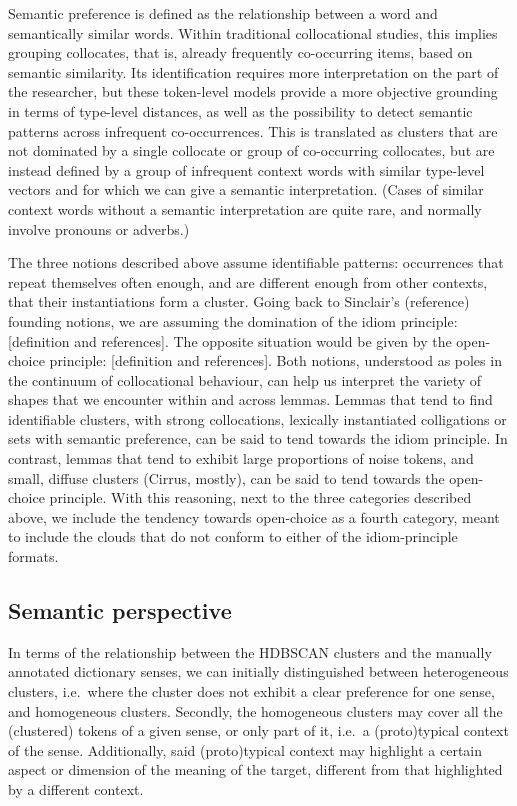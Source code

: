 \documentclass[
]{book}
\begin{document}
Semantic preference is defined as the relationship between a word and semantically similar words. Within traditional collocational studies, this implies grouping collocates, that is, already frequently co-occurring items, based on semantic similarity. Its identification requires more interpretation on the part of the researcher, but these token-level models provide a more objective grounding in terms of type-level distances, as well as the possibility to detect semantic patterns across infrequent co-occurrences. This is translated as clusters that are not dominated by a single collocate or group of co-occurring collocates, but are instead defined by a group of infrequent context words with similar type-level vectors and for which we can give a semantic interpretation. (Cases of similar context words without a semantic interpretation are quite rare, and normally involve pronouns or adverbs.)

The three notions described above assume identifiable patterns: occurrences that repeat themselves often enough, and are different enough from other contexts, that their instantiations form a cluster. Going back to Sinclair's (reference) founding notions, we are assuming the domination of the idiom principle: {[}definition and references{]}. The opposite situation would be given by the open-choice principle: {[}definition and references{]}. Both notions, understood as poles in the continuum of collocational behaviour, can help us interpret the variety of shapes that we encounter within and across lemmas. Lemmas that tend to find identifiable clusters, with strong collocations, lexically instantiated colligations or sets with semantic preference, can be said to tend towards the idiom principle. In contrast, lemmas that tend to exhibit large proportions of noise tokens, and small, diffuse clusters (Cirrus, mostly), can be said to tend towards the open-choice principle. With this reasoning, next to the three categories described above, we include the tendency towards open-choice as a fourth category, meant to include the clouds that do not conform to either of the idiom-principle formats.

\hypertarget{semantically}{%
\subsection{Semantic perspective}\label{semantically}}

In terms of the relationship between the HDBSCAN clusters and the manually annotated dictionary senses, we can initially distinguished between heterogeneous clusters, i.e.~where the cluster does not exhibit a clear preference for one sense, and homogeneous clusters. Secondly, the homogeneous clusters may cover all the (clustered) tokens of a given sense, or only part of it, i.e.~a (proto)typical context of the sense. Additionally, said (proto)typical context may highlight a certain aspect or dimension of the meaning of the target, different from that highlighted by a different context.
\end{document}
